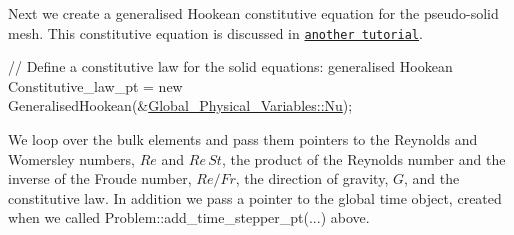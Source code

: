 Next we create a generalised Hookean constitutive equation for the pseudo-\/solid mesh. This constitutive equation is discussed in \href{../../../solid/disk_compression/html/index.html#hooke}{\tt another tutorial}.


\begin{DoxyCodeInclude}
 \textcolor{comment}{// Define a constitutive law for the solid equations: generalised Hookean}
 Constitutive\_law\_pt = \textcolor{keyword}{new} GeneralisedHookean(&\hyperlink{namespaceGlobal__Physical__Variables_a3962c36313826b19f216f6bbbdd6a477}{Global\_Physical\_Variables::Nu});

\end{DoxyCodeInclude}


We loop over the bulk elements and pass them pointers to the Reynolds and Womersley numbers, $ Re $ and $ Re\, St $, the product of the Reynolds number and the inverse of the Froude number, $ Re/Fr $, the direction of gravity, $ G $, and the constitutive law. In addition we pass a pointer to the global time object, created when we called {\ttfamily Problem\+::add\+\_\+time\+\_\+stepper\+\_\+pt}(...) above.


